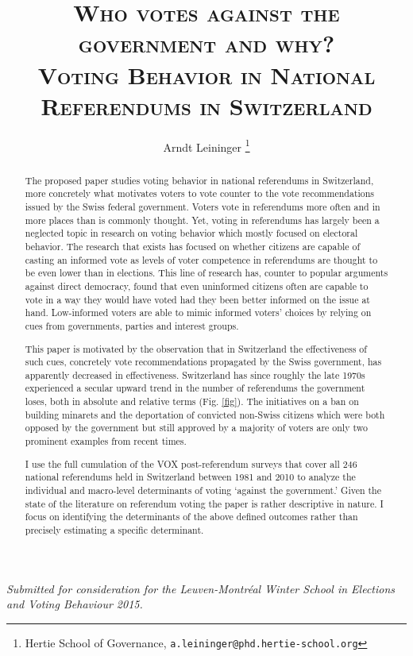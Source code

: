 \documentclass[11pt,a4paper]{article}
\author{Arndt Leininger \thanks{Hertie School of Governance, \texttt{a.leininger@phd.hertie-school.org}}}
\title{\Large{\textsc{Who votes against the government and why?}}\\ \large{\textsc{Voting Behavior in National Referendums in Switzerland}}} %
\date{}
\begin{document}
\maketitle

{\small \textit{Submitted for consideration for the Leuven-Montréal Winter School in Elections and Voting Behaviour 2015.}}


\begin{abstract}
    The proposed paper studies voting behavior in national referendums in Switzerland, more concretely what motivates voters to vote counter to the vote recommendations issued by the Swiss federal government. Voters vote in referendums more often and in more places than is commonly thought. Yet, voting in referendums has largely been a neglected topic in research on voting behavior which mostly focused on electoral behavior. The research that exists has focused on whether citizens are capable of casting an informed vote as levels of voter competence in referendums are thought to be even lower than in elections. This line of research has, counter to popular arguments against direct democracy, found that even uninformed citizens often are capable to vote in a way they would have voted had they been better informed on the issue at hand. Low-informed  voters are able to mimic informed voters' choices by relying on cues from governments, parties and interest groups.
    
    This paper is motivated by the observation that in Switzerland the effectiveness of such cues, concretely vote recommendations propagated by the Swiss government, has apparently decreased in effectiveness. Switzerland has since roughly the late 1970s experienced a secular upward trend in the number of referendums the government loses, both in absolute and relative terms (Fig. \ref{fig}). The initiatives on a ban on building minarets and the deportation of convicted non-Swiss citizens which were both opposed by the government but still approved by a majority of voters are only two prominent examples from recent times.
    
    I use the full cumulation of the VOX post-referendum surveys that cover all 246 national referendums held in Switzerland between 1981 and 2010 to analyze the individual and macro-level determinants of voting `against the government.' Given the state of the literature on referendum voting the paper is rather descriptive in nature. I focus on identifying the determinants of the above defined outcomes rather than precisely estimating a specific determinant.
    

\end{abstract}
\end{document}
